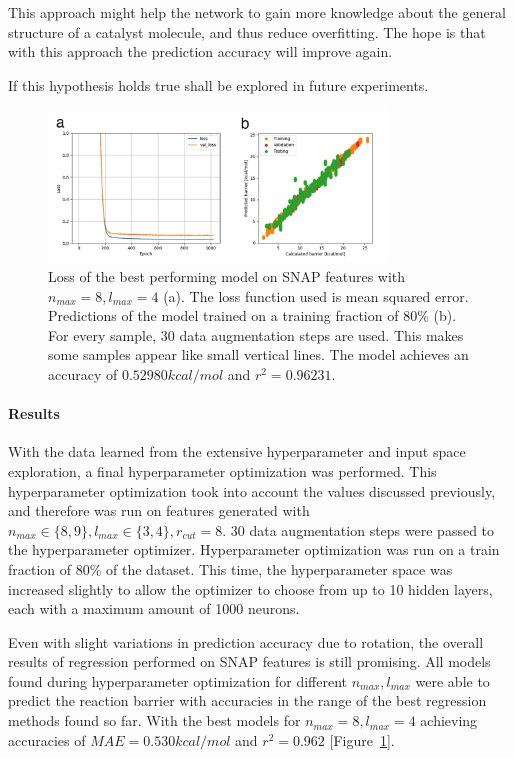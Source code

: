 This approach might help the network to gain more knowledge about the general structure of a catalyst molecule,
and thus reduce overfitting.
The hope is that with this approach the prediction accuracy will improve again.

If this hypothesis holds true shall be explored in future experiments.

\begin{figure}[H]
  \centering
  \includegraphics[width=0.8\textwidth]{figures/regression/snap/snap-result.png}
  \caption[Best performing model on SNAP features]{
    Loss of the best performing model on SNAP features with  $n_{max}=8, l_{max}=4$ (a). 
    The loss function used is mean squared error.
    Predictions of the model trained on a training fraction of 80\% (b). 
    For every sample, 30 data augmentation steps are used. This makes some samples appear like small vertical lines.
    The model achieves an accuracy of $0.52980 kcal/mol$ and $r^2 = 0.96231$.
  }
  \label{fig:snap_results}

\end{figure}


\paragraph{Results}

With the data learned from the extensive hyperparameter and input space exploration, a final hyperparameter
optimization was performed.
This hyperparameter optimization took into account the values discussed previously, and therefore was run on 
features  generated with $ n_{max} \in \{8,9\}, l_{max} \in \{3,4\}, r_{cut}=8$.
30 data augmentation steps were passed to the hyperparameter optimizer.
Hyperparameter optimization was run on a train fraction of 80\% of the dataset.
This time, the hyperparameter space was increased slightly to allow the optimizer
to choose from up to 10 hidden layers, each with a maximum amount of 1000 neurons.

Even with slight variations in prediction accuracy due to rotation, the overall results of regression performed on SNAP features is still promising.
All models found during hyperparameter optimization for different $n_{max}, l_{max}$ were able to predict the reaction barrier with accuracies in the
range of the best regression methods found so far.
With the best models for $n_{max}=8, l_{max}=4$ achieving accuracies of $MAE=0.530 kcal/mol$ and $r^2=0.962$ [Figure~\ref{fig:snap_results}].

